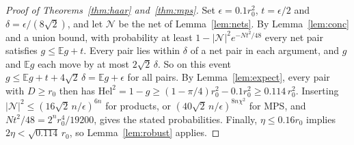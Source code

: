\documentclass[11pt]{article}
\theoremstyle{definition}
\theoremstyle{remark}
\newcommand{\Hel}{\mathrm{Hel}}
\newcommand{\E}{\mathbb{E}}
\begin{document}
\begin{proof}[Proof of Theorems~\ref{thm:haar} and~\ref{thm:mps}]
Set $\epsilon=0.1r_0^2$, $t=\epsilon/2$ and $\delta=\epsilon/(8\sqrt2)$, and let $\mathcal N$ be the net of Lemma~\ref{lem:nets}. By Lemma~\ref{lem:conc} and a union bound, with probability at least $1-|\mathcal N|^2e^{-Nt^2/48}$ every net pair satisfies $g\le\E g+t$. Every pair lies within $\delta$ of a net pair in each argument, and $g$ and $\E g$ each move by at most $2\sqrt2\,\delta$. So on this event $g\le\E g+t+4\sqrt2\,\delta=\E g+\epsilon$ for all pairs. By Lemma~\ref{lem:expect}, every pair with $D\ge r_0$ then has $\Hel^2=1-g\ge(1-\pi/4)r_0^2-0.1r_0^2\ge0.114\,r_0^2$. Inserting $|\mathcal N|^2\le(16\sqrt2\,n/\epsilon)^{6n}$ for products, or $(40\sqrt2\,n/\epsilon)^{8n\chi^2}$ for MPS, and $Nt^2/48=2^nr_0^4/19200$, gives the stated probabilities. Finally, $\eta\le0.16r_0$ implies $2\eta<\sqrt{0.114}\,r_0$, so Lemma~\ref{lem:robust} applies.
\end{proof}
\end{document}
